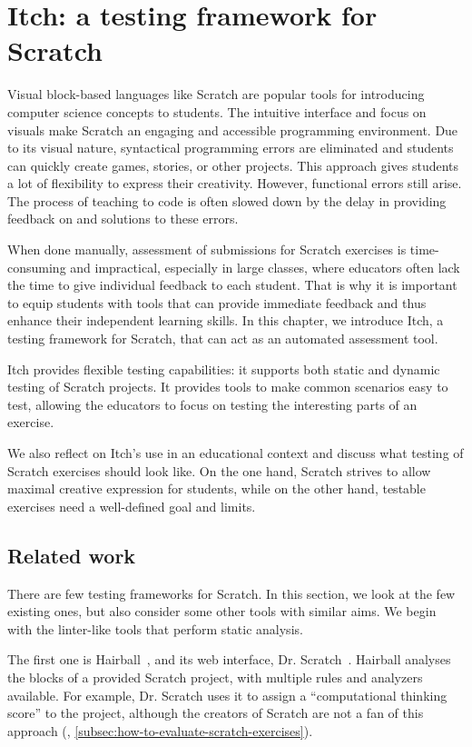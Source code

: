 \documentclass[../main]{subfiles}
\begin{document}
\chapter{Itch: a testing framework for Scratch}\label{ch:itch}

Visual block-based languages like Scratch are popular tools for introducing computer science concepts to students.
The intuitive interface and focus on visuals make Scratch an engaging and accessible programming environment.
Due to its visual nature, syntactical programming errors are eliminated and students can quickly create games, stories, or other projects.
This approach gives students a lot of flexibility to express their creativity.
However, functional errors still arise.
The process of teaching to code is often slowed down by the delay in providing feedback on and solutions to these errors.

When done manually, assessment of submissions for Scratch exercises is time-consuming and impractical, especially in large classes, where educators often lack the time to give individual feedback to each student.
That is why it is important to equip students with tools that can provide immediate feedback and thus enhance their independent learning skills.
In this chapter, we introduce Itch, a testing framework for Scratch, that can act as an automated assessment tool.

Itch provides flexible testing capabilities: it supports both static and dynamic testing of Scratch projects.
It provides tools to make common scenarios easy to test, allowing the educators to focus on testing the interesting parts of an exercise.

We also reflect on Itch's use in an educational context and discuss what testing of Scratch exercises should look like.
On the one hand, Scratch strives to allow maximal creative expression for students, while on the other hand, testable exercises need a well-defined goal and limits.

\section{Related work}\label{sec:related-work}

There are few testing frameworks for Scratch.
In this section, we look at the few existing ones, but also consider some other tools with similar aims.
We begin with the linter-like tools that perform static analysis.

The first one is Hairball~\autocite{boeHairballLintinspiredStatic2013}, and its web interface, Dr. Scratch~\autocite{moreno-leonDrScratchWeb2015}.
Hairball analyses the blocks of a provided Scratch project, with multiple rules and analyzers available.
For example, Dr. Scratch uses it to assign a ``computational thinking score'' to the project, although the creators of Scratch are not a fan of this approach (\autocite{resnickCodingCrossroads2020}, \cref{subsec:how-to-evaluate-scratch-exercises}).
\end{document}

